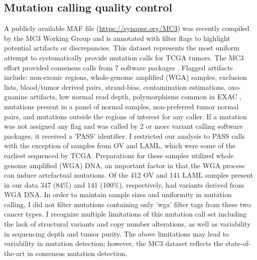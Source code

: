 \subsection{Mutation calling quality control}
A publicly available MAF file (\url{https://synapse.org/MC3}) was recently compiled by the MC3 Working Group and is annotated with filter flags to highlight potential artifacts or discrepancies. This dataset represents the most uniform attempt to systematically provide mutation calls for TCGA tumors. The MC3 effort provided consensus calls from 7 software packages \cite{RN167}. Flagged artifacts include: non-exonic regions, whole-genome amplified (WGA) samples, exclusion lists, blood/tumor derived pairs, strand-bias, contamination estimations, oxo-guanine artifacts, low normal read depth, polymorphisms common in EXAC \cite{RN168}, mutations present in a panel of normal samples, non-preferred tumor normal pairs, and mutations outside the regions of interest for any caller. If a mutation was not assigned any flag and was called by 2 or more variant calling software packages, it received a 'PASS' identifier. I restricted our analysis to PASS calls with the exception of samples from OV and LAML, which were some of the earliest sequenced by TCGA. Preparations for these samples utilized whole genome amplified (WGA) DNA, an important factor in that the WGA process can induce artefactual mutations. Of the 412 OV and 141 LAML samples present in our data 347 (84\%) and 141 (100\%), respectively, had variants derived from WGA DNA. In order to maintain sample sizes and uniformity in mutation calling, I did not filter mutations containing only 'wga' filter tags from these two cancer types. I recognize multiple limitations of this mutation call set including the lack of structural variants and copy number alterations, as well as variability in sequencing depth and tumor purity. The above limitations may lead to variability in mutation detection; however, the MC3 dataset reflects the state-of-the-art in consensus mutation detection.

